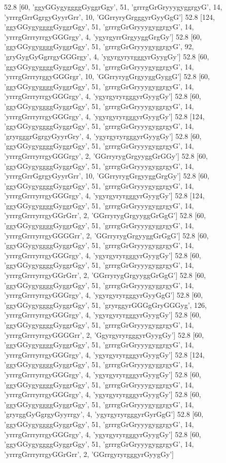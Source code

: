 52.8 [60, 'ggyGGygyggggGyggrGgy', 51, 'grrrgGrGryyygyggrgyG', 14, 'yrrrgGrrGgrgyGyyrGrr', 10, 'GGrryryGrgggyrGyyGgG']
52.8 [124, 'ggyGGygyggggGyggrGgy', 51, 'grrrgGrGryyygyggrgyG', 14, 'yrrrgGrrryrrgyGGGrgy', 4, 'ygyrgyrrGrgyyggGrgGy']
52.8 [60, 'ggyGGygyggggGyggrGgy', 51, 'grrrgGrGryyygyggrgyG', 92, 'gryGygGyGgrrgyGGGrgy', 4, 'ygyrgyryrgggyrGyygGy']
52.8 [60, 'ggyGGygyggggGyggrGgy', 51, 'grrrgGrGryyygyggrgyG', 14, 'yrrrgGrrryrggyGGGrgr', 10, 'GGrryrygGrgyyggGyggG']
52.8 [60, 'ggyGGygyggggGyggrGgy', 51, 'grrrgGrGryyygyggrgyG', 14, 'yrrrgGrrryrrgyGGGrgy', 4, 'ygyrgyryrgggyrGyygGy']
52.8 [60, 'ggyGGygyggggGyggrGgy', 51, 'grrrgGrGryyygyggrgyG', 14, 'yrrrgGrrryrrgyGGGrgy', 4, 'ygyrgyryrgggyrGyygGy']
52.8 [124, 'ggyGGygyggggGyggrGgy', 51, 'grrrgGrGryyygyggrgyG', 14, 'gryrgggrGgrgyGyyrGry', 4, 'ygyrgyryrgggyrGyygGy']
52.8 [60, 'ggyGGygyggggGyggrGgy', 51, 'grrrgGrGryyygyggrgyG', 14, 'yrrrgGrrryrrgyGGGrgy', 2, 'GGrryrygGrgyyggGrGGy']
52.8 [60, 'ggyGGygyggggGyggrGgy', 51, 'grrrgGrGryyygyggrgyG', 14, 'yrrrgGrrGgrgyGyyrGrr', 10, 'GGrryrygGrgyyggGrgGy']
52.8 [60, 'ggyGGygyggggGyggrGgy', 51, 'grrrgGrGryyygyggrgyG', 14, 'yrrrgGrrryrrgyGGGrgy', 4, 'ygyrgyryrgggyrGyygGy']
52.8 [124, 'ggyGGygyggggGyggrGgy', 51, 'grrrgGrGryyygyggrgyG', 14, 'yrrrgGrrryrrgyGGrGrr', 2, 'GGrryrygGrgyyggGrGgG']
52.8 [60, 'ggyGGygyggggGyggrGgy', 51, 'grrrgGrGryyygyggrgyG', 14, 'yrrrgGrrryrrgyGGGGrr', 2, 'GGrryrygGrgyyggGrGgG']
52.8 [60, 'ggyGGygyggggGyggrGgy', 51, 'grrrgGrGryyygyggrgyG', 14, 'yrrrgGrrryrrgyGGGrgy', 4, 'ygyrgyryrgggyrGyygGy']
52.8 [60, 'ggyGGygyggggGyggrGgy', 51, 'grrrgGrGryyygyggrgyG', 14, 'yrrrgGrrryrrgyGGrGrr', 2, 'GGrryrygGrgyyggGrGgG']
52.8 [60, 'ggyGGygyggggGyggrGgy', 51, 'grrrgGrGryyygyggrgyG', 14, 'yrrrgGrrryrrgyGGGrgy', 4, 'ygyrgyryrgggyrGyyGgG']
52.8 [60, 'ggyGGygyggggGyggrGgy', 51, 'gryrggyrGGGgGryGGGyg', 126, 'yrrrgGrrryrrgyGGGrgy', 4, 'ygyrgyryrgggyrGyygGy']
52.8 [60, 'ggyGGygyggggGyggrGgy', 51, 'grrrgGrGryyygyggrgyG', 14, 'yrrrgGrrryrrgyGGGGrr', 2, 'GgyrgyryrgggyrGyygGy']
52.8 [60, 'ggyGGygyggggGyggrGgy', 51, 'grrrgGrGryyygyggrgyG', 14, 'yrrrgGrrryrrgyGGGrgy', 4, 'ygyrgyryrgggyrGyygGy']
52.8 [124, 'ggyGGygyggggGyggrGgy', 51, 'grrrgGrGryyygyggrgyG', 14, 'yrrrgGrrryrrgyGGGrgy', 4, 'ygyrgyryrgggyrGyygGy']
52.8 [60, 'ggyGGygyggggGyggrGgy', 51, 'grrrgGrGryyygyggrgyG', 14, 'yrrrgGrrryrrgyGGGrgy', 4, 'ygyrgyryrgggyrGyygGy']
52.8 [60, 'ggyGGygyggggGyggrGgy', 51, 'grrrgGrGryyygyggrgyG', 14, 'gryrggGyGgrgyGyyrrgy', 4, 'ygyrgyryrgggyrGyrGgG']
52.8 [60, 'ggyGGygyggggGyggrGgy', 51, 'grrrgGrGryyygyggrgyG', 14, 'yrrrgGrrryrrgyGGGrgy', 4, 'ygyrgyryrgggyrGyygGy']
52.8 [60, 'ggyGGygyggggGyggrGgy', 51, 'grrrgGrGryyygyggrgyG', 14, 'yrrrgGrrryrrgyGGrGrr', 2, 'GGrrgyryrgggyrGyygGy']
